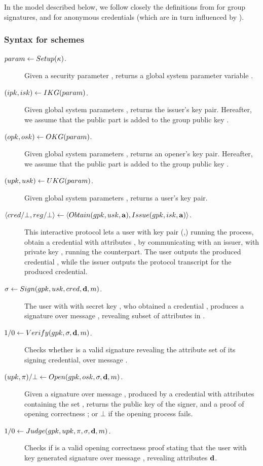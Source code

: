 In the model described below, we follow closely the definitions from
\cite{bsz05} for group signatures, and \cite{fhs19} for anonymous credentials
(which are in turn influenced by \cite{bsz05}).

\subsubsection{Syntax for \GSAC schemes}
\label{sssec:syntax-gsac}

\begin{description}
\item[$param \gets Setup(\kappa)$.] Given a security parameter \secpar,
  returns a global system parameter variable \parm.
\item[$(ipk,isk) \gets IKG(param)$.] Given global system parameters
  \parm, returns the issuer's key pair. Hereafter, we assume that the public
  part \ipk is added to the group public key \gpk.
\item[$(opk,osk) \gets OKG(param)$.] Given global system parameters
  \parm, returns an opener's key pair. Hereafter, we assume that the public part
  \opk is added to the group public key \gpk.
\item[$(upk,usk) \gets UKG(param)$.] Given global system parameters
  \parm, returns a user's key pair.
\item[$\langle cred/\bot,reg/\bot \rangle \gets
  \langle Obtain(gpk,usk,\mathbf{a}),Issue(gpk,isk,\mathbf{a}) \rangle$.]
  This interactive protocol lets a user with key pair (\upk,\usk) running the
  \Obtain process, obtain a credential \cred with attributes \attrs, by
  communicating with an issuer, with private key \isk, running the \Issue
  counterpart. The user outputs the produced credential \cred, while the issuer
  outputs the protocol transcript \utrans for the produced credential.
\item[$\sigma \gets Sign(gpk,usk,cred,\mathbf{d},m)$.] The user with
  with secret key \usk, who obtained a credential \cred, produces a signature
  \sig over message \msg, revealing subset of attributes \dattrs in \cred.
\item[$1/0 \gets Verify(gpk,\sigma,\mathbf{d},m)$.] Checks whether \sig is a
  valid signature revealing the attribute set \dattrs of its signing credential,
  over message \msg.
\item[$(upk,\pi)/\bot \gets
  Open(gpk,osk,\sigma,\mathbf{d},m)$.]
  Given a signature \sig over message \msg, produced by a credential with
  attributes containing the set \dattrs, returns the public key \upk of the
  signer, and a proof of opening correctness \oproof; or $\bot$ if the
  opening process fails.
\item[$1/0 \gets Judge(gpk,upk,\pi,\sigma,\mathbf{d},
  m)$.] Checks if \oproof is a valid opening correctness proof stating that
  the user with key \upk generated signature \sig over message \msg, revealing
  attributes $\mathbf{d}$. 
\end{description}

